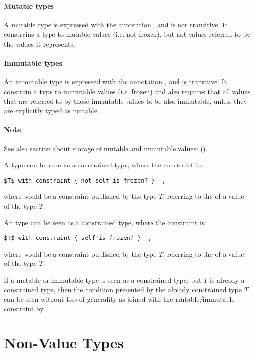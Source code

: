 \paragraph{Mutable types}
A mutable type is expressed with the annotation , and is not transitive. It constrains a type to mutable values (i.e. not frozen), but not values referred to by the values it represents. 

\paragraph{Immutable types}
An immutable type is expressed with the annotation , and is transitive. It constrain a type to immutable values (i.e. frozen) and also requires that all values that are referred to by those immutable values to be also immutable, unless they are explicitly typed as mutable. 

\paragraph{Note}
See also section about storage of mutable and immutable values: ().

A  type can be seen as a constrained type, where the constraint is:
\begin{lstlisting}
$T$ with constraint { not self'is_frozen? }  ,
\end{lstlisting}
where  would be a constraint published by the type $T$, referring to the  of a value of the type $T$. 

An  type can be seen as a constrained type, where the constraint is:
\begin{lstlisting}
$T$ with constraint { self'is_frozen? }  ,
\end{lstlisting}
where  would be a constraint published by the type $T$, referring to the  of a value of the type $T$. 

If a mutable or immutable type is seen as a constrained type, but $T$ is already a constrained type, then the condition presented by the already constrained type $T$ can be seen without loss of generality as joined with the mutable/immutable constraint by . 





\section{Non-Value Types}

